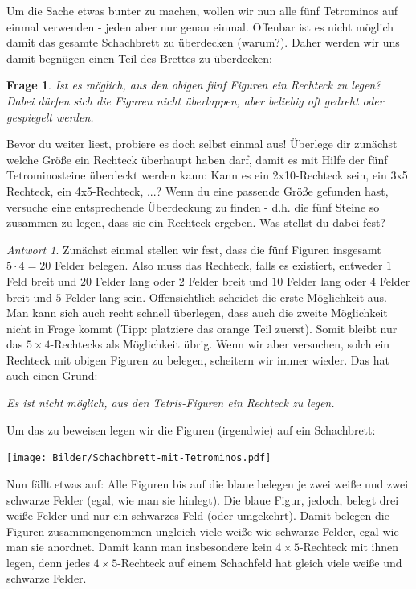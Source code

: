 \documentclass[a4paper,ngerman,12pt]{scrartcl}
\theoremstyle{definition}
\theoremstyle{plain}
\newtheorem{frage}[defn]{Frage}
\theoremstyle{remark}
\newtheorem*{antwort}{Antwort}
\begin{document}
Um die Sache etwas bunter zu machen, wollen wir nun alle fünf Tetrominos auf einmal verwenden - jeden aber nur genau einmal. Offenbar ist es nicht möglich damit das gesamte Schachbrett zu überdecken (warum?). Daher werden wir uns damit begnügen einen Teil des Brettes zu überdecken:

\begin{frage}
	Ist es möglich, aus den obigen fünf Figuren ein Rechteck zu legen? Dabei dürfen sich die Figuren nicht überlappen, aber beliebig oft gedreht oder gespiegelt werden.
\end{frage}

Bevor du weiter liest, probiere es doch selbst einmal aus! Überlege dir zunächst welche Größe ein Rechteck überhaupt haben darf, damit es mit Hilfe der fünf Tetrominosteine überdeckt werden kann: Kann es ein 2x10-Rechteck sein, ein 3x5 Rechteck, ein 4x5-Rechteck, ...? Wenn du eine passende Größe gefunden hast, versuche eine entsprechende Überdeckung zu finden - d.h. die fünf Steine so zusammen zu legen, dass sie ein Rechteck ergeben. Was stellst du dabei fest?

\begin{antwort}
	Zunächst einmal stellen wir fest, dass die fünf Figuren insgesamt $5 \cdot 4 = 20$ Felder belegen. Also muss das Rechteck, falls es existiert, entweder $1$ Feld breit und $20$ Felder lang oder $2$ Felder breit und $10$ Felder lang oder $4$ Felder breit und $5$ Felder lang sein. Offensichtlich scheidet die erste Möglichkeit aus. Man kann sich auch recht schnell überlegen, dass auch die zweite Möglichkeit nicht in Frage kommt (Tipp: platziere das orange Teil zuerst). Somit bleibt nur das $5 \times 4$-Rechtecks als Möglichkeit übrig. Wenn wir aber versuchen, solch ein Rechteck mit obigen Figuren zu belegen, scheitern wir immer wieder. Das hat auch einen Grund:
	
	\begin{center}
		\emph{Es ist nicht möglich, aus den Tetris-Figuren ein Rechteck zu legen.}
	\end{center}
	
	Um das zu beweisen legen wir die Figuren (irgendwie) auf ein Schachbrett:
	
	\begin{center}
		\texttt{[image: Bilder/Schachbrett-mit-Tetrominos.pdf]}
	\end{center}	
	
	Nun fällt etwas auf: Alle Figuren bis auf die blaue belegen je zwei weiße und zwei schwarze Felder (egal, wie man sie hinlegt). Die blaue Figur, jedoch, belegt drei weiße Felder und nur ein schwarzes Feld (oder umgekehrt). Damit belegen die Figuren zusammengenommen ungleich viele weiße wie schwarze Felder, egal wie man sie anordnet. Damit kann man insbesondere kein $4 \times 5$-Rechteck mit ihnen legen, denn jedes $4 \times 5$-Rechteck auf einem Schachfeld hat gleich viele weiße und schwarze Felder.
\end{antwort}
\end{document}
